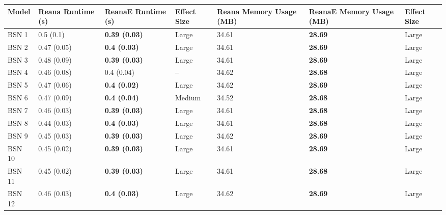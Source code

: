 \begin{tabular}{lllllll}
\toprule
  Model & Reana Runtime (s) &    ReanaE Runtime (s) & Effect Size & Reana Memory Usage (MB) & ReanaE Memory Usage (MB) & Effect Size \\
\midrule
  BSN 1 &         0.5 (0.1) &  \textbf{0.39 (0.03)} &       Large &                   34.61 &           \textbf{28.69} &       Large \\
  BSN 2 &       0.47 (0.05) &   \textbf{0.4 (0.03)} &       Large &                   34.61 &           \textbf{28.69} &       Large \\
  BSN 3 &       0.48 (0.09) &  \textbf{0.39 (0.03)} &       Large &                   34.61 &           \textbf{28.69} &       Large \\
  BSN 4 &       0.46 (0.08) &            0.4 (0.04) &          -- &                   34.62 &           \textbf{28.68} &       Large \\
  BSN 5 &       0.47 (0.06) &   \textbf{0.4 (0.02)} &       Large &                   34.62 &           \textbf{28.69} &       Large \\
  BSN 6 &       0.47 (0.09) &   \textbf{0.4 (0.04)} &      Medium &                   34.52 &           \textbf{28.68} &       Large \\
  BSN 7 &       0.46 (0.03) &  \textbf{0.39 (0.03)} &       Large &                   34.61 &           \textbf{28.68} &       Large \\
  BSN 8 &       0.44 (0.03) &   \textbf{0.4 (0.03)} &       Large &                   34.61 &           \textbf{28.68} &       Large \\
  BSN 9 &       0.45 (0.03) &  \textbf{0.39 (0.03)} &       Large &                   34.62 &           \textbf{28.69} &       Large \\
 BSN 10 &       0.45 (0.02) &  \textbf{0.39 (0.03)} &       Large &                   34.61 &           \textbf{28.69} &       Large \\
 BSN 11 &       0.45 (0.02) &  \textbf{0.39 (0.03)} &       Large &                   34.61 &           \textbf{28.68} &       Large \\
 BSN 12 &       0.46 (0.03) &   \textbf{0.4 (0.03)} &       Large &                   34.62 &           \textbf{28.69} &       Large \\
\bottomrule
\end{tabular}
